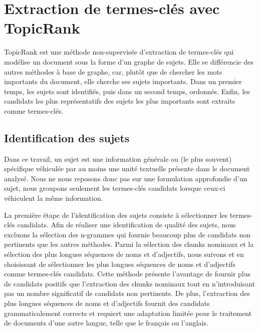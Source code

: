 \section{Extraction de termes-clés avec TopicRank}
\label{sec:extraction_de_termes_cles_avec_topicrank}
  TopicRank est une méthode non-supervisée d'extraction de termes-clés qui
  modélise un document sous la forme d'un graphe de sujets.
  Elle se différencie des autres méthodes à base de graphe, car, plutôt que de
  chercher les mots importants du document, elle cherche ses sujets importants.
  Dans un premier temps, les sujets sont identifiés, puis dans un second temps,
  ordonnés. Enfin, les candidats les plus représentatifs des sujets les plus
  importants sont extraits comme termes-clés.

  \subsection{Identification des sujets}
  \label{subsec:identification_des_sujets}
    Dans ce travail, un sujet est une information générale ou (le plus souvent)
    spécifique véhiculée par au moins une unité textuelle présente dans le
    document analysé. Nous ne nous reposons donc pas sur une formulation
    approfondie d'un sujet, nous groupons seulement les termes-clés candidats
    lorsque ceux-ci véhiculent la même information.

    La première étape de l'identification des sujets consiste à sélectionner les
    termes-clés candidats.
    Afin de réaliser une identification de qualité des sujets, nous excluons
    la sélection des n-grammes qui fournie beaucoup plus de candidats non
    pertinents que les autres méthodes. Parmi la sélection des chunks nominaux
    et la sélection des plus longues séquences de noms et d'adjectifs, nous
    suivons  et  en
    choisissant de sélectionner les plus longues séquences de noms et
    d'adjectifs comme termes-clés candidats. Cette méthode présente l'avantage
    de fournir plus de candidats positifs que l'extraction des chunks nominaux
    tout en n'introduisant pas un nombre significatif de candidats non
    pertinents. De plus, l'extraction des plus longues séquences de noms et
    d'adjectifs fournit des candidats grammaticalement corrects et requiert une
    adaptation limitée pour le traitement de documents d'une autre langue, telle
    que le français ou l'anglais.

